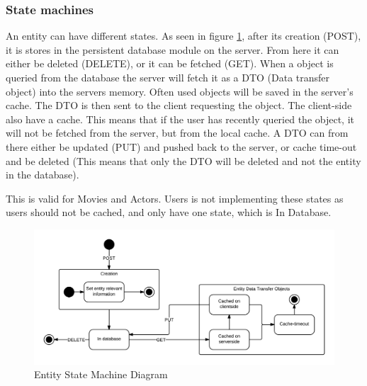 \subsubsection{State machines}
An entity can have different states. As seen in figure \ref{fig:Entity State Machine Diagram}, after its creation (POST), it is stores in the persistent database module on the server. From here it can either be deleted (DELETE), or it can be fetched (GET). When a object is queried from the database the server will fetch it as a DTO (Data transfer object) into the servers memory. Often used objects will be saved in the server's cache. The DTO is then sent to the client requesting the object. The client-side also have a cache. This means that if the user has recently queried the object, it will not be fetched from the server, but from the local cache. A DTO can from there either be updated (PUT) and pushed back to the server, or cache time-out and be deleted (This means that only the DTO will be deleted and not the entity in the database).

This is valid for Movies and Actors. Users is not implementing these states as users should not be cached, and only have one state, which is In Database.   

\begin{figure}[H]
\includegraphics[width=\linewidth]{img/EntityStateMachineDiagram.png}
\caption{Entity State Machine Diagram}
\label{fig:Entity State Machine Diagram}
\end{figure}
\newpage
